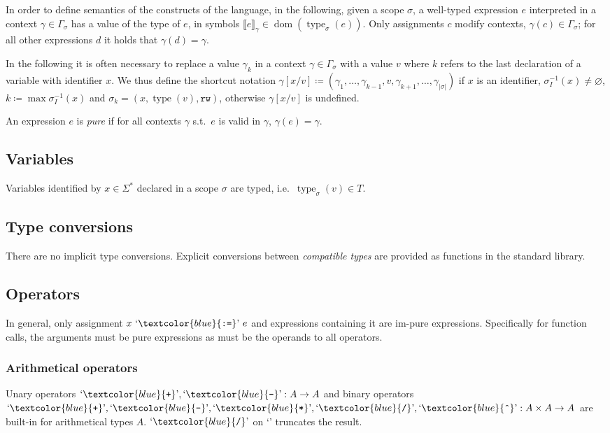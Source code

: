 \documentclass[a4paper,11pt,parskip=half]{scrartcl}
\newcommand*\lang[1]{\text`\textcolor{blue}{\text{\ttfamily{#1}}}\text'{}}
\newcommand*\dom{\operatorname{dom}}
\newcommand*\ctxval[2][\gamma]{\llbracket{#2}\rrbracket_{#1}}
\newcommand*\sctype[2][\sigma]{\operatorname{type}_{#1}(#2)}
\newcommand*\scrw{\mathtt{rw}}
\begin{document}
In order to define semantics of the constructs of the language,
in the following, given a scope $\sigma$, a well-typed expression $e$
interpreted in a context $\gamma\in\Gamma_\sigma$ has a value of the type of $e$,
in symbols $\ctxval e\in\dom(\sctype e)$. Only assignments $c$
modify contexts, $\gamma(c)\in\Gamma_\sigma$;
for all other expressions $d$ it holds that $\gamma(d)=\gamma$.

In the following it is often necessary to replace a value $\gamma_k$ in a
context $\gamma\in\Gamma_\sigma$ with a value $v$ where $k$ refers to the last
declaration of a variable with identifier $x$.
We thus define the shortcut notation
$\gamma[x/v]\coloneqq
(\gamma_1,\ldots,\gamma_{k-1},v,\gamma_{k+1},\ldots,\gamma_{|\sigma|})$
if $x$ is an identifier, $\sigma_I^{-1}(x)\neq\varnothing$,
$k\coloneqq\max\sigma_I^{-1}(x)$ and $\sigma_k=(x,\operatorname{type}(v),\scrw)$,
otherwise $\gamma[x/v]$ is undefined.

An expression $e$ is \emph{pure} if for all contexts $\gamma$ s.t.\ $e$ is valid
in $\gamma$, $\gamma(e)=\gamma$.

\subsection{Variables}
Variables identified by $x\in\Sigma^*$ declared in a scope $\sigma$ are typed,
i.e.\ $\operatorname{type}_\sigma(v)\in T$.

\subsection{Type conversions}
There are no implicit type conversions. Explicit conversions between
\emph{compatible types} are provided as functions in the standard library.

\subsection{Operators}
In general, only assignment $x~\lang{:=}~e$ and expressions containing it are
im-pure expressions.
Specifically for function calls, the arguments must be pure expressions as
must be the operands to all operators.

\subsubsection{Arithmetical operators}
Unary operators $\lang+,\lang-:A\to A$ and
binary operators $\lang+,\lang-,\lang*,\lang/,\lang{\^{}}:A\times A\to A$
are built-in for arithmetical types $A$.
$\lang/$ on \lang{Integer} truncates the result.
\end{document}
